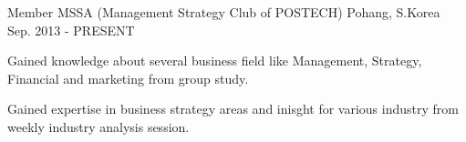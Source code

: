 \begin{cventries}

\cventry
{Member} %
{MSSA (Management Strategy Club of POSTECH)} %
{Pohang, S.Korea} %
{Sep. 2013 - PRESENT} %
{ %
\begin{cvitems}
\item {Gained knowledge about several business field like Management, Strategy, Financial and marketing from group study.}
\item {Gained expertise in business strategy areas and inisght for various industry from weekly industry analysis session.}
\end{cvitems}
}


\end{cventries}